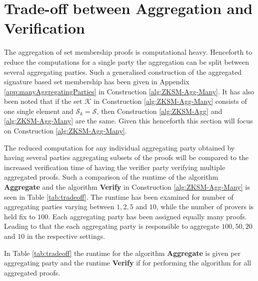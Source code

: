 \section{Trade-off between Aggregation and Verification}
The aggregation of set membership proofs is computational heavy. Henceforth to reduce the computations for a single party the aggregation can be split between several aggregating parties. Such a generalised construction of the aggregated signature based set membership has been given in Appendix \ref{app:manyAggregatingParties} in Construction \ref{alg:ZKSM-Agg-Many}. It has also been noted that if the set $\mathcal{K}$ in Construction \ref{alg:ZKSM-Agg-Many} consists of one single element and $\mathcal{S}_k=\mathcal{S}$, then Construction \ref{alg:ZKSM-Agg} and \ref{alg:ZKSM-Agg-Many} are the same. Given this henceforth this section will focus on Construction \ref{alg:ZKSM-Agg-Many}. 

The reduced computation for any individual aggregating party obtained by having several parties aggregating subsets of the proofs will be compared to the increased verification time of having the verifier party verifying multiple aggregated proofs. Such a comparison of the runtime of the algorithm \textbf{Aggregate} and the algorithm \textbf{Verify} in Construction \ref{alg:ZKSM-Agg-Many} is seen in Table \ref{tab:tradeoff}. The runtime has been examined for number of aggregating parties varying between $1,2,5$ and $10$, while the number of provers is held fix to $100$. Each aggregating party has been assigned equally many proofs. Leading to that the each aggregating party is responsible to aggregate $100,50,20$ and $10$ in the respective settings. 

In Table \ref{tab:tradeoff} the runtime for the algorithm \textbf{Aggregate} is given per aggregating party and the runtime \textbf{Verify} if for performing the algorithm for all aggregated proofs. 





